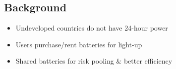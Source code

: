 \documentclass[a0,portrait]{a0poster}
\begin{document}
\begin{multicols}{2} %


%




\fontsize{27}{34}
\selectfont

\color{Black} %
\section*{Background}
\begin{itemize}


\item Undeveloped countries do not have 24-hour power
\item Users purchase/rent batteries for light-up
\item Shared batteries for risk pooling \& better efficiency


\end{itemize}
\end{multicols}
\end{document}

